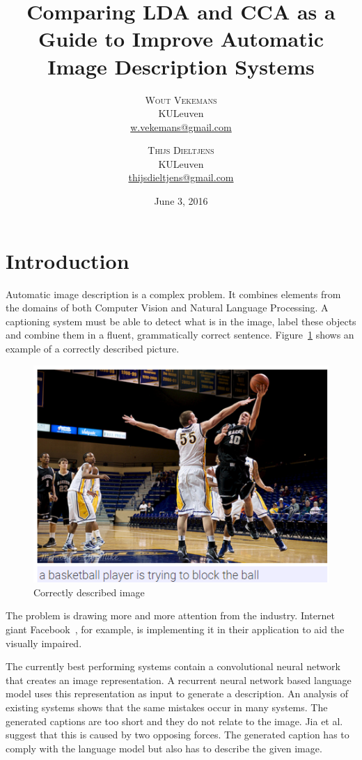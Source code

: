 \documentclass[twoside,twocolumn]{article}
\title{Comparing LDA and CCA as a Guide to Improve Automatic Image Description Systems} %
\author{%
	\textsc{Wout Vekemans} \\[1ex] %
	\normalsize KULeuven \\ %
	\normalsize \href{mailto:w.vekemans@gmail.com}{w.vekemans@gmail.com}
	\and %
	\textsc{Thijs Dieltjens} \\[1ex] %
	\normalsize KULeuven \\ %
	\normalsize \href{mailto:thijsdieltjens@gmail.com}{thijsdieltjens@gmail.com} %
}
\date{June 3, 2016} %
\begin{document}
	
	\maketitle
	
	
	\section{Introduction}
	Automatic image description is a complex problem. It combines elements from the domains of both Computer Vision and Natural Language Processing. A captioning system must be able to detect what is in the image, label these objects and combine them in a fluent, grammatically correct sentence. Figure~\ref{fig:exampledescription} shows an example of a correctly described picture.
	
	\begin{figure}[!htb]
		\centering
		\includegraphics[width=\linewidth]{blocking_the_ball_trimmed.png}
		\caption{Correctly described image}
		\label{fig:exampledescription}
	\end{figure}
	
	The problem is drawing more and more attention from the industry. Internet giant Facebook~\cite{facebook}, for example, is implementing it in their application to aid the visually impaired.
	
	The currently best performing systems contain a convolutional neural network that creates an image representation. A recurrent neural network based language model uses this representation as input to generate a description.
	An analysis of existing systems shows that the same mistakes occur in many systems. The generated captions are too short and they do not relate to the image. Jia et al.~\cite{Fernando2015} suggest that this is caused by two opposing forces. The generated caption has to comply with the language model but also has to describe the given image.
	
\end{document}
